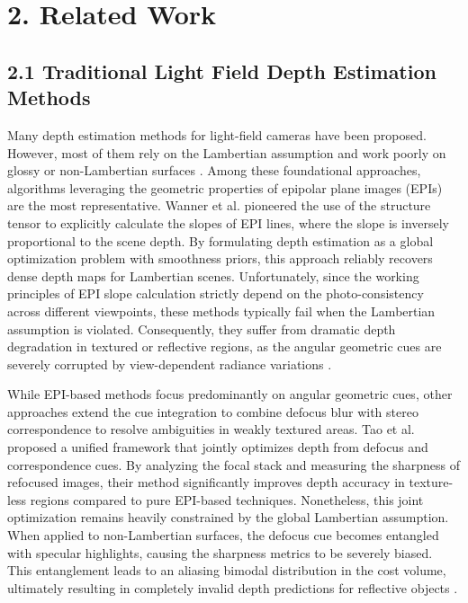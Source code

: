 \section{2. Related Work}

\subsection{2.1 Traditional Light Field Depth Estimation Methods}

Many depth estimation methods for light-field cameras have been proposed. However, most of them rely on the Lambertian assumption and work poorly on glossy or non-Lambertian surfaces . Among these foundational approaches, algorithms leveraging the geometric properties of epipolar plane images (EPIs) are the most representative. Wanner et al.  pioneered the use of the structure tensor to explicitly calculate the slopes of EPI lines, where the slope is inversely proportional to the scene depth. By formulating depth estimation as a global optimization problem with smoothness priors, this approach reliably recovers dense depth maps for Lambertian scenes. Unfortunately, since the working principles of EPI slope calculation strictly depend on the photo-consistency across different viewpoints, these methods typically fail when the Lambertian assumption is violated. Consequently, they suffer from dramatic depth degradation in textured or reflective regions, as the angular geometric cues are severely corrupted by view-dependent radiance variations .

While EPI-based methods focus predominantly on angular geometric cues, other approaches extend the cue integration to combine defocus blur with stereo correspondence to resolve ambiguities in weakly textured areas. Tao et al.  proposed a unified framework that jointly optimizes depth from defocus and correspondence cues. By analyzing the focal stack and measuring the sharpness of refocused images, their method significantly improves depth accuracy in texture-less regions compared to pure EPI-based techniques. Nonetheless, this joint optimization remains heavily constrained by the global Lambertian assumption. When applied to non-Lambertian surfaces, the defocus cue becomes entangled with specular highlights, causing the sharpness metrics to be severely biased. This entanglement leads to an aliasing bimodal distribution in the cost volume, ultimately resulting in completely invalid depth predictions for reflective objects .


